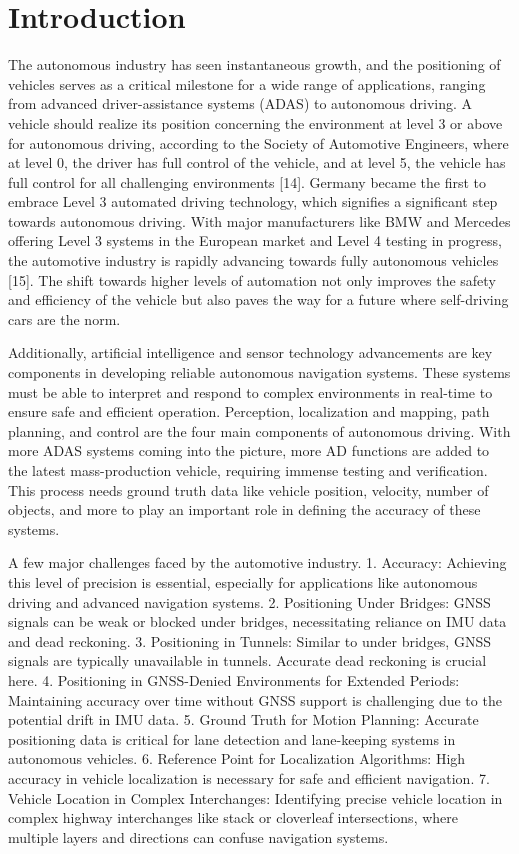 \section{Introduction}\label{Introduction}

The autonomous industry has seen instantaneous growth, and the positioning of vehicles serves as a
critical milestone for a wide range of applications, ranging from advanced driver-assistance systems
(ADAS) to autonomous driving. A vehicle should realize its position concerning the environment at
level 3 or above for autonomous driving, according to the Society of Automotive Engineers, where
at level 0, the driver has full control of the vehicle, and at level 5, the vehicle has full control for all
challenging environments [14]. Germany became the first to embrace Level 3 automated driving
technology, which signifies a significant step towards autonomous driving. With major
manufacturers like BMW and Mercedes offering Level 3 systems in the European market and Level
4 testing in progress, the automotive industry is rapidly advancing towards fully autonomous vehicles
[15]. The shift towards higher levels of automation not only improves the safety and efficiency of
the vehicle but also paves the way for a future where self-driving cars are the norm.

Additionally, artificial intelligence and sensor technology advancements are key components in
developing reliable autonomous navigation systems. These systems must be able to interpret and
respond to complex environments in real-time to ensure safe and efficient operation. Perception,
localization and mapping, path planning, and control are the four main components of autonomous
driving. With more ADAS systems coming into the picture, more AD functions are added to the
latest mass-production vehicle, requiring immense testing and verification. This process needs
ground truth data like vehicle position, velocity, number of objects, and more to play an important
role in defining the accuracy of these systems.

A few major challenges faced by the automotive industry.
1. Accuracy: Achieving this level of precision is essential, especially for applications like
autonomous driving and advanced navigation systems.
2. Positioning Under Bridges: GNSS signals can be weak or blocked under bridges,
necessitating reliance on IMU data and dead reckoning.
3. Positioning in Tunnels: Similar to under bridges, GNSS signals are typically unavailable in
tunnels. Accurate dead reckoning is crucial here.
4. Positioning in GNSS-Denied Environments for Extended Periods: Maintaining accuracy
over time without GNSS support is challenging due to the potential drift in IMU data.
5. Ground Truth for Motion Planning: Accurate positioning data is critical for lane detection
and lane-keeping systems in autonomous vehicles.
6. Reference Point for Localization Algorithms: High accuracy in vehicle localization is
necessary for safe and efficient navigation.
7. Vehicle Location in Complex Interchanges: Identifying precise vehicle location in complex
highway interchanges like stack or cloverleaf intersections, where multiple layers and
directions can confuse navigation systems.
